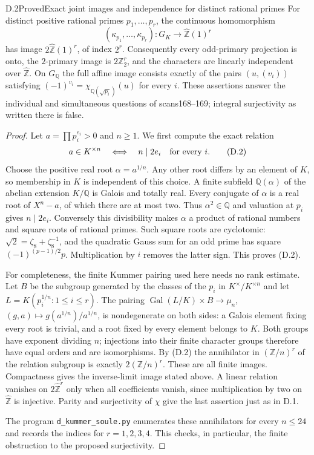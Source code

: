 \begin{statement}{D.2}{Proved}{Exact joint images and independence for distinct rational primes}
For distinct positive rational primes $p_1,\ldots,p_r$, the continuous homomorphism
\[
 (\kappa_{p_1},\ldots,\kappa_{p_r}):G_K\longrightarrow
 \widehat{\mathbb Z}(1)^r
\]
has image $2\widehat{\mathbb Z}(1)^r$, of index $2^r$. Consequently every odd-primary projection is onto, the $2$-primary image is $2\mathbb Z_2^r$, and the characters are linearly independent over $\widehat{\mathbb Z}$. On $G_{\mathbb Q}$ the full affine image consists exactly of the pairs $(u,(v_i))$ satisfying
$(-1)^{v_i}=\chi_{\mathbb Q(\sqrt{p_i})}(u)$ for every $i$.
These assertions answer the individual and simultaneous questions of scans168--169; integral surjectivity as written there is false.
\end{statement}
\begin{proof}
Let $a=\prod p_i^{e_i}>0$ and $n\geq1$. We first compute the exact relation
\[
 a\in K^{\times n}\quad\Longleftrightarrow\quad n\mid2e_i\quad\hbox{for every }i.       \tag{D.2}
\]
Choose the positive real root $\alpha=a^{1/n}$. Any other root differs by an element of $K$, so membership in $K$ is independent of this choice. A finite subfield $\mathbb Q(\alpha)$ of the abelian extension $K/\mathbb Q$ is Galois and totally real. Every conjugate of $\alpha$ is a real root of $X^n-a$, of which there are at most two. Thus $\alpha^2\in\mathbb Q$ and valuation at $p_i$ gives $n\mid2e_i$. Conversely this divisibility makes $\alpha$ a product of rational numbers and square roots of rational primes. Such square roots are cyclotomic: $\sqrt2=\zeta_8+\zeta_8^{-1}$, and the quadratic Gauss sum for an odd prime has square $(-1)^{(p-1)/2}p$. Multiplication by $i$ removes the latter sign. This proves (D.2).

For completeness, the finite Kummer pairing used here needs no rank estimate. Let $B$ be the subgroup generated by the classes of the $p_i$ in $K^\times/K^{\times n}$ and let $L=K(p_i^{1/n}:1\leq i\leq r)$. The pairing
$\operatorname{Gal}(L/K)\times B\to\mu_n$, $(g,a)\mapsto g(a^{1/n})/a^{1/n}$,
is nondegenerate on both sides: a Galois element fixing every root is trivial, and a root fixed by every element belongs to $K$. Both groups have exponent dividing $n$; injections into their finite character groups therefore have equal orders and are isomorphisms. By (D.2) the annihilator in $(\mathbb Z/n)^r$ of the relation subgroup is exactly $2(\mathbb Z/n)^r$. These are all finite images. Compactness gives the inverse-limit image stated above. A linear relation vanishes on $2\widehat{\mathbb Z}^r$ only when all coefficients vanish, since multiplication by two on $\widehat{\mathbb Z}$ is injective. Parity and surjectivity of $\chi$ give the last assertion just as in D.1.

The program \texttt{d\_kummer\_soule.py} enumerates these annihilators for every $n\leq24$ and records the indices for $r=1,2,3,4$. This checks, in particular, the finite obstruction to the proposed surjectivity.
\end{proof}

